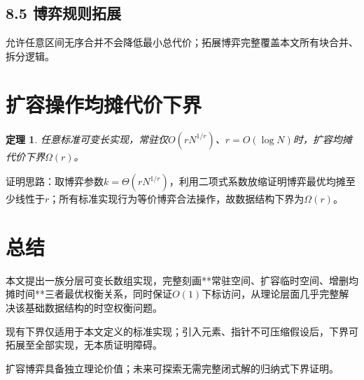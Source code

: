 \documentclass[11pt,a4paper]{article}
\newtheorem{thm}{定理}[section]
\begin{document}
\subsection{8.5 博弈规则拓展}
允许任意区间无序合并不会降低最小总代价；拓展博弈完整覆盖本文所有块合并、拆分逻辑。

\section{扩容操作均摊代价下界}
\begin{thm}
任意标准可变长实现，常驻仅$O(rN^{1/r})$、$r=O(\log N)$时，扩容均摊代价下界$\Omega(r)$。
\end{thm}
证明思路：取博弈参数$k=\Theta(rN^{1/r})$，利用二项式系数放缩证明博弈最优均摊至少线性于$r$；所有标准实现行为等价博弈合法操作，故数据结构下界为$\Omega(r)$。

\section{总结}
本文提出一族分层可变长数组实现，完整刻画**常驻空间、扩容临时空间、增删均摊时间**三者最优权衡关系，同时保证$O(1)$下标访问，从理论层面几乎完整解决该基础数据结构的时空权衡问题。

现有下界仅适用于本文定义的标准实现；引入元素、指针不可压缩假设后，下界可拓展至全部实现，无本质证明障碍。

扩容博弈具备独立理论价值；未来可探索无需完整闭式解的归纳式下界证明。
\end{document}
